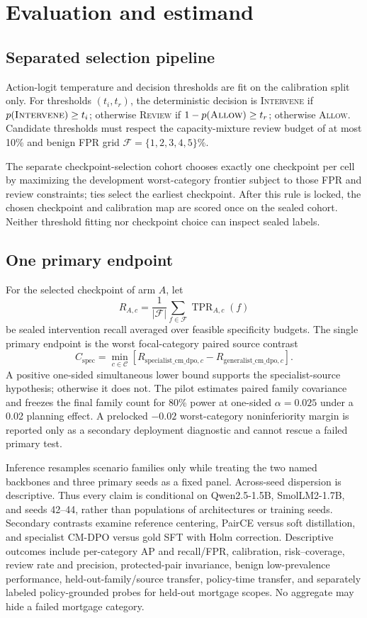 \documentclass[10pt]{article}
\newcommand{\method}{\textsc{CM-DPO}}
\newcommand{\allow}{\textsc{Allow}}
\newcommand{\review}{\textsc{Review}}
\newcommand{\intervene}{\textsc{Intervene}}
\begin{document}
\section{Evaluation and estimand}

\subsection{Separated selection pipeline}

Action-logit temperature and decision thresholds are fit on the calibration
split only. For thresholds $(t_i,t_r)$, the deterministic decision is
\intervene{} if $p(\intervene)\ge t_i$; otherwise \review{} if
$1-p(\allow)\ge t_r$; otherwise \allow. Candidate thresholds must respect the
capacity-mixture review budget of at most 10\% and benign FPR grid
$\mathcal F=\{1,2,3,4,5\}\%$.

The separate checkpoint-selection cohort chooses exactly one checkpoint per
cell by maximizing the development worst-category frontier subject to those FPR
and review constraints; ties select the earliest checkpoint. After this rule is
locked, the chosen checkpoint and calibration map are scored once on the sealed
cohort. Neither threshold fitting nor checkpoint choice can inspect sealed
labels.

\subsection{One primary endpoint}

For the selected checkpoint of arm $A$, let
\[
R_{A,c}=\frac{1}{|\mathcal F|}\sum_{f\in\mathcal F}
\operatorname{TPR}_{A,c}(f)
\]
be sealed intervention recall averaged over feasible specificity budgets. The
single primary endpoint is the worst focal-category paired source contrast
\[
C_{\mathrm{spec}}=\min_{c\in\mathcal C}
\left[R_{\mathrm{specialist\_cm\_dpo},c}-
R_{\mathrm{generalist\_cm\_dpo},c}\right].
\]
A positive one-sided simultaneous lower bound supports the specialist-source
hypothesis; otherwise it does not. The pilot estimates paired family covariance
and freezes the final family count for 80\% power at one-sided
$\alpha=0.025$ under a 0.02 planning effect. A prelocked $-0.02$
worst-category noninferiority margin is reported only as a secondary deployment
diagnostic and cannot rescue a failed primary test.

Inference resamples scenario families only while treating the two named
backbones and three primary seeds as a fixed panel. Across-seed dispersion is
descriptive. Thus every claim is conditional on Qwen2.5-1.5B,
SmolLM2-1.7B, and seeds 42--44, rather than populations of architectures or
training seeds. Secondary
contrasts examine reference centering, PairCE versus soft distillation, and
specialist \method{} versus gold SFT with Holm correction. Descriptive outcomes
include per-category AP and recall/FPR, calibration, risk--coverage, review rate
and precision, protected-pair invariance, benign low-prevalence performance,
held-out-family/source transfer, policy-time transfer, and separately labeled
policy-grounded probes for held-out mortgage scopes. No aggregate may hide a
failed mortgage category.
\end{document}
